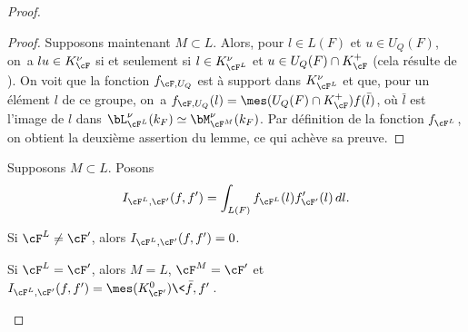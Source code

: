 \begin{proof}
\begin{proof}
Supposons maintenant $M\subset L$. Alors, pour $l\in L(F)$ et $u\in U_{Q}(F)$, on~a $lu\in K_{\cF}^{\nu}$ si et seulement si $l\in K_{\cF^L}^{\nu}$ et $u\in U_{Q}(F)\cap K_{\cF}^+$ (cela résulte de \cite[Lem.\,6]{W2}). On voit que la fonction $f_{\cF,U_{Q}}$ est à support dans $K_{\cF^L}^{\nu}$ et que, pour un élément $l$ de ce groupe, on~a $f_{\cF,U_{Q}}(l)=\mes(U_{Q}(F)\cap K_{\cF}^+)f(\bar{l})$, où $\bar{l}$ est l'image de $l$ dans $\bL_{\cF^L}^{\nu}(k_{F})\simeq \bM_{\cF^M}^{\nu}(k_{F})$. Par définition de la fonction $f_{\cF^L}$, on obtient la deuxième assertion du lemme, ce qui achève sa preuve.
\end{proof}

Supposons $M\subset L$. Posons
\[
I_{\cF^L,\cF'}(f,f')=\int_{L(F)}f_{\cF^L}(l)f'_{\cF'}(l)\, dl.
\]

\skpt
\begin{lem}\label{lem2}
\begin{enumeratei}
\item\label{lem2i}
Si
$\cF^L\neq\cF'$, alors $I_{\cF^L,\cF'}(f,f')=0$.

\item\label{lem2ii}
Si $\cF^L=\cF'$, alors $M=L$, $\cF^M=\cF'$ et $I_{\cF^L,\cF'}(f,f')=\mes(K_{\cF'}^0)\<\bar{f},f'\>$.
\end{enumeratei}
\end{lem}


\end{proof}
